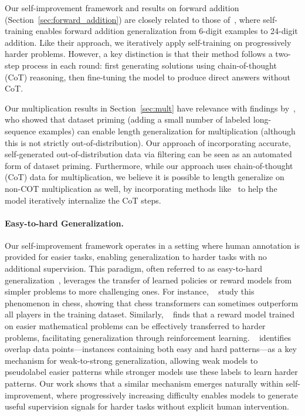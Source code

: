 Our self-improvement framework and results on forward addition (Section~\ref{sec:forward_addition}) are closely related to those of~\citet{zhang2023chain}, where self-training enables forward addition generalization from 6-digit examples to 24-digit addition. Like their approach, we iteratively apply self-training on progressively harder problems. However, a key distinction is that their method follows a two-step process in each round: first generating solutions using chain-of-thought (CoT) reasoning, then fine-tuning the model to produce direct answers without CoT. 

Our multiplication results in Section~\ref{sec:mult} have relevance with findings by~\citet{jelassi2023length}, who showed that dataset priming (adding a small number of labeled long-sequence examples) can enable length generalization for multiplication (although this is not strictly out-of-distribution). Our approach of incorporating accurate, self-generated out-of-distribution data via filtering can be seen as an automated form of dataset priming.
Furthermore, while our approach uses chain-of-thought (CoT) data for multiplication, we believe it is possible to length generalize on non-COT multiplication as well, by incorporating methods like~\citet{deng2024explicit} to help the model iteratively internalize the CoT steps.




\paragraph{Easy-to-hard Generalization.} 
Our self-improvement framework operates in a setting where human annotation is provided for easier tasks, enabling generalization to harder tasks with no additional supervision. This paradigm, often referred to as easy-to-hard generalization~\citep{schwarzschild2021can,bansal2022end,burns2023weak,hase2024unreasonable,sun2024easy}, leverages the transfer of learned policies or reward models from simpler problems to more challenging ones.
For instance, ~\citet{zhang2024transcendence} study this phenomenon in chess, showing that chess transformers can sometimes outperform all players in the training dataset. Similarly, ~\citet{sun2024easy} finds that a reward model trained on easier mathematical problems can be effectively transferred to harder problems, facilitating generalization through reinforcement learning. ~\citet{shin2024weak} identifies overlap data points—instances containing both easy and hard patterns—as a key mechanism for weak-to-strong generalization, allowing weak models to pseudolabel easier patterns while stronger models use these labels to learn harder patterns. Our work shows that a similar mechanism emerges naturally within self-improvement, where progressively increasing difficulty enables models to generate useful supervision signals for harder tasks without explicit human intervention.








